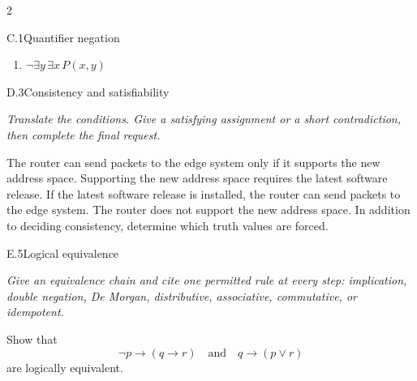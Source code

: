 \documentclass[9pt]{extarticle}
\begin{document}
\begin{multicols}{2}
\begin{CoreProblem}{C.1}{Quantifier negation}
\begin{enumerate}[label=(\alph*)]
  \item $\neg\exists y\,\exists x\,P(x,y)$
\end{enumerate}
\end{CoreProblem}
\columnbreak
\begin{CoreProblem}{D.3}{Consistency and satisfiability}
{\scriptsize\textit{Translate the conditions. Give a satisfying assignment or a short contradiction, then complete the final request.}\par}
The router can send packets to the edge system only if it supports the new
address space. Supporting the new address space requires the latest software
release. If the latest software release is installed, the router can send
packets to the edge system. The router does not support the new address space.
In addition to deciding consistency, determine which truth values are forced.
\end{CoreProblem}
\begin{CoreProblem}{E.5}{Logical equivalence}
{\scriptsize\textit{Give an equivalence chain and cite one permitted rule at every step: implication, double negation, De Morgan, distributive, associative, commutative, or idempotent.}\par}
Show that
\[
  \neg p\to(q\to r)
  \quad\text{and}\quad
  q\to(p\lor r)
\]
are logically equivalent.
\end{CoreProblem}
\end{multicols}
\CoreWorkArea
\FormBreak
{}
\end{document}
